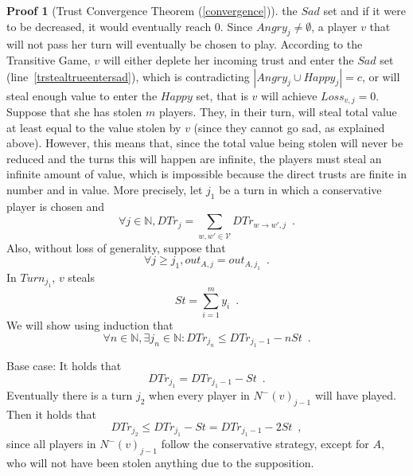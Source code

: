 \documentclass[11pt]{llncs}
\theoremstyle{definition}
\newtheorem{sepproof}{Proof}
\begin{document}
\begin{sepproof}[Trust Convergence Theorem (\ref{convergence})]
       the $Sad$ set and if it were to be decreased, it would eventually reach 0. Since $Angry_j \neq \emptyset$, a player
       $v$ that will not pass her turn will eventually be chosen to play. According to the Transitive Game, $v$ will either
       deplete her incoming trust and enter the $Sad$ set (line~\ref{trstealtrueentersad}), which is contradicting $|Angry_j
       \cup Happy_j| = c$, or will steal enough value to enter the $Happy$ set, that is $v$ will achieve $Loss_{v, j} = 0$.
       Suppose that she has stolen $m$ players. They, in their turn, will steal total value at least equal to the value
       stolen by $v$ (since they cannot go sad, as explained above). However, this means that, since the total value being
       stolen will never be reduced and the turns this will happen are infinite, the players must steal an infinite amount of
       value, which is impossible because the direct trusts are finite in number and in value. More precisely, let $j_1$ be
       a turn in which a conservative player is chosen and
       \begin{equation*}
          \forall j \in \mathbb{N}, DTr_j = \sum\limits_{w,w' \in \mathcal{V}}DTr_{w \rightarrow w', j} \enspace.
       \end{equation*}
       Also, without loss of generality, suppose that
       \begin{equation*}
          \forall j \geq j_1, out_{A, j} = out_{A, j_1} \enspace.
       \end{equation*}
       In $Turn_{j_1}$, $v$ steals
       \begin{equation*}
          St = \sum\limits_{i=1}^{m}y_i \enspace.
       \end{equation*}
       We will show using induction that
       \begin{equation*}
          \forall n \in \mathbb{N}, \exists j_n \in \mathbb{N} : DTr_{j_n} \leq DTr_{j_1-1} - nSt \enspace.
       \end{equation*}

       Base case: It holds that
       \begin{equation*}
          DTr_{j_1} = DTr_{j_1-1} - St \enspace.
       \end{equation*}
       Eventually there is a turn $j_2$ when every player in $N^{-}(v)_{j-1}$ will have played. Then it holds that
       \begin{equation*}
          DTr_{j_2} \leq DTr_{j_1} - St = DTr_{j_1-1} - 2St \enspace,
       \end{equation*}
       since all players in $N^{-}(v)_{j-1}$ follow the conservative strategy, except for $A$, who will not have been stolen
       anything due to the supposition.


\end{sepproof}
\end{document}
